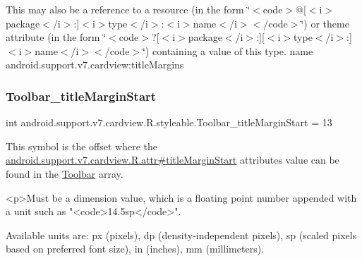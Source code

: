 This may also be a reference to a resource (in the form \char`\"{}$<$code$>$@\mbox{[}$<$i$>$package$<$/i$>$\+:\mbox{]}$<$i$>$type$<$/i$>$\+:$<$i$>$name$<$/i$>$$<$/code$>$\char`\"{}) or theme attribute (in the form \char`\"{}$<$code$>$?\mbox{[}$<$i$>$package$<$/i$>$\+:\mbox{]}\mbox{[}$<$i$>$type$<$/i$>$\+:\mbox{]}$<$i$>$name$<$/i$>$$<$/code$>$\char`\"{}) containing a value of this type.  name android.\+support.\+v7.\+cardview\+:title\+Margins \mbox{\label{classandroid_1_1support_1_1v7_1_1cardview_1_1R_1_1styleable_ab25420371f54701b5a8cf6d7a885519b}} 
\subsubsection{\texorpdfstring{Toolbar\+\_\+title\+Margin\+Start}{Toolbar\_titleMarginStart}}
{\footnotesize\ttfamily int android.\+support.\+v7.\+cardview.\+R.\+styleable.\+Toolbar\+\_\+title\+Margin\+Start = 13\hspace{0.3cm}{\ttfamily [static]}}

This symbol is the offset where the \hyperlink{classandroid_1_1support_1_1v7_1_1cardview_1_1R_1_1attr_a050e6de5fb5747b3da0d7378d952214c}{android.\+support.\+v7.\+cardview.\+R.\+attr\#title\+Margin\+Start} attribute\textquotesingle{}s value can be found in the \hyperlink{classandroid_1_1support_1_1v7_1_1cardview_1_1R_1_1styleable_a26149aeb8fd339abe09ecc9d92b9304f}{Toolbar} array.

\begin{DoxyVerb}      <p>Must be a dimension value, which is a floating point number appended with a unit such as "<code>14.5sp</code>".
\end{DoxyVerb}
 Available units are\+: px (pixels), dp (density-\/independent pixels), sp (scaled pixels based on preferred font size), in (inches), mm (millimeters). 

